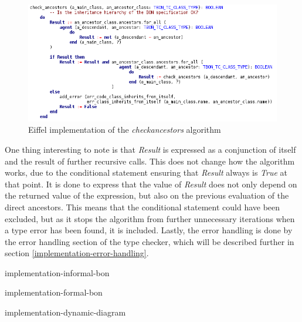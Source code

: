 \begin{figure}
\centerline{
\includegraphics[scale=0.7]{images/check_ancestors_eiffel_code.png}
}
\caption{Eiffel implementation of the \textit{check}\textunderscore\textit{ancestors} algorithm}
\label{fig:eiffel_check_ancestors}
\end{figure}

One thing interesting to note is that \textit{Result} is expressed as a conjunction of itself and the result of further recursive calls. This does not change how the algorithm works, due to the conditional statement ensuring that \textit{Result} always is \textit{True} at that point. It is done to express that the value of \textit{Result} does not only depend on the returned value of the expression, but also on the previous evaluation of the direct ancestors. This means that the conditional statement could have been excluded, but as it stops the algorithm from further unnecessary iterations when a type error has been found, it is included.
Lastly, the error handling is done by the error handling section of the type checker, which will be described further in section \ref{implementation-error-handling}.

{implementation-informal-bon}

{implementation-formal-bon}

{implementation-dynamic-diagram}

